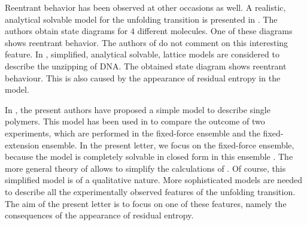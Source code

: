 \documentclass[doublecol,figures]{epl2}
\begin{document}
Reentrant behavior has been observed at other occasions as well. A realistic, analytical solvable model for the unfolding transition is presented in \cite{referee8b}. The authors obtain state diagrams for $4$ different molecules. One of these diagrams shows reentrant behavior. The authors of \cite{referee8b} do not comment on this interesting feature. In \cite{referee8bis}, simplified, analytical solvable, lattice models are considered to describe the unzipping of DNA. The obtained state diagram shows reentrant behaviour. This is also caused by the appearance of residual entropy in the model.

In \cite{referee9}, the present authors have proposed a simple model to describe
single polymers. This model has been used in \cite{referee10} to compare the
outcome of two experiments, which are performed in the fixed-force ensemble and the fixed-extension ensemble. In the present letter, we focus on the fixed-force ensemble, because the model is completely solvable in closed form in this ensemble \cite{referee10}. The more general theory of \cite{referee11} allows to simplify the calculations of \cite{referee9,referee10}. Of course, this simplified model is of a qualitative nature. More sophisticated models are needed to describe all the experimentally observed features of the unfolding transition. The aim of the present letter is to focus on one of these features, namely the consequences of the appearance of residual entropy. 
\end{document}
